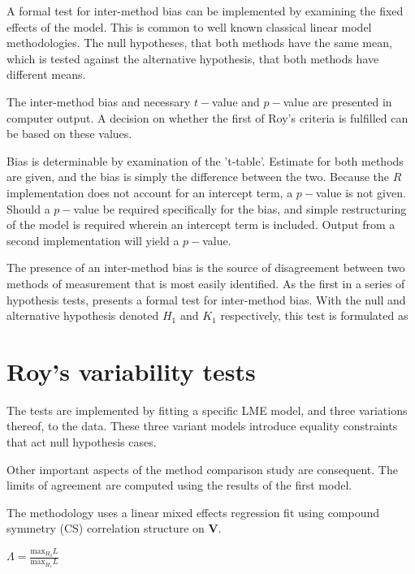 \documentclass[12pt, a4paper]{report}
\theoremstyle{plain}
\theoremstyle{definition}
\theoremstyle{remark}
\begin{document}
A formal test for inter-method bias can be implemented by examining the fixed effects of the model. This is common to well known classical linear model methodologies. The null hypotheses, that both methods have the same mean, which is tested against the alternative hypothesis, that both methods have different means.

The inter-method bias and necessary $t-$value and $p-$value are presented in computer output. A decision on whether the first of Roy's criteria is fulfilled can be based on these values.

Bias is determinable by examination of the 't-table'. Estimate for both methods are given, and the bias is simply the difference between the two. Because the $R$ implementation does not account for an intercept term, a $p-$value is not given. Should a $p-$value be required specifically for the bias, and simple restructuring of the model is required wherein an intercept term is included. Output from a second implementation will yield a $p-$value.

The presence of an inter-method bias is the source of disagreement between two methods of measurement that is most easily identified. As the first in a series of hypothesis tests, \citet{roy} presents a formal test for inter-method bias. With the null and alternative hypothesis denoted $H_1$ and $K_1$ respectively, this test is formulated as
%


\section{Roy's variability tests}


The tests are implemented by fitting a specific LME model, and three variations thereof, to the data. These three variant models introduce equality constraints that act null hypothesis cases.

Other important aspects of the method comparison study are consequent. The limits of agreement are computed using the results of the first model.




The methodology uses a linear mixed effects regression fit using
compound symmetry (CS) correlation structure on \textbf{V}.


$\Lambda = \frac{\mbox{max}_{H_{0}}L}{\mbox{max}_{H_{1}}L}$
\end{document}

